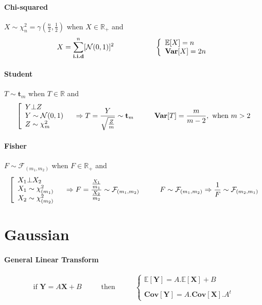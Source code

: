 \documentclass[a4paper,10pt]{article}
\begin{document}
\paragraph{Chi-squared} $X\sim \chi^2_n= \gamma(\frac{n}{2}, \frac{1}{2})$ when  $X \in \mathbb{R}_+$ and
\[
X = \sum^{n}_{\textbf{i.i.d}} [ \mathcal{N}(0,1) ]^2
\hspace{20mm}
\left\{
\begin{array}{l}
\mathbb{E}[X]= n \\
\textbf{Var}[X]=2n
\end{array}\right.
\]


\paragraph{Student} $T\sim \textbf{t}_m$ when  $T \in \mathbb{R}$ and
\[
\left[
\begin{array}{l}
Y \bot Z                \\
Y \sim \mathcal{N}(0,1) \\
Z \sim  \chi^2_m  
\end{array}\right.
\hspace{3mm} \Rightarrow
T=\frac{Y}{\sqrt{\frac{Z}{m}}} \sim \textbf{t}_m
\hspace{10mm}
\textbf{Var}[T]= \frac{m}{m-2} , \text{  when } m>2 
\]


\paragraph{Fisher} $F\sim \mathcal{F}_{(m_1,m_2)}$ when  $F \in \mathbb{R}_+$ and
\[
\left[
\begin{array}{l}
X_1 \bot X_2            \\
X_1 \sim \chi^2_{(m_1)} \\
X_2 \sim \chi^2_{(m_2)}
\end{array}\right.
\hspace{3mm} \Rightarrow
F=\frac{\frac{X_1}{m_1}}{\frac{X_2}{m_2}} \sim \mathcal{F}_{(m_1,m_2)}
\hspace{10mm}
F\sim \mathcal{F}_{(m_1,m_2)} \Rightarrow \frac{1}{F} \sim \mathcal{F}_{(m_2,m_1)} 
\]



\section{Gaussian}
\paragraph{General Linear Transform}
\[
\text{if }
\textbf{Y} = A \textbf{X} + B
\hspace{1cm}
\text{ then }
\hspace{1cm}
\left\{
\begin{array}{l}
\mathbb{E}[\textbf{Y}] = A.\mathbb{E}[\textbf{X}] + B  \\ \\
\textbf{Cov}[\textbf{Y}] =  A .\textbf{Cov}[\textbf{X}]. A^t  
\end{array}\right.
\]
\end{document}

